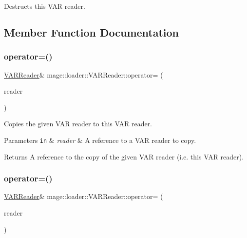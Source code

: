 Destructs this V\+AR reader. 

\subsection{Member Function Documentation}
\hypertarget{classmage_1_1loader_1_1_v_a_r_reader_a78d39071ad5103c848782ff82be397bb}{}\label{classmage_1_1loader_1_1_v_a_r_reader_a78d39071ad5103c848782ff82be397bb} 
\subsubsection{\texorpdfstring{operator=()}{operator=()}\hspace{0.1cm}{\footnotesize\ttfamily [1/2]}}
{\footnotesize\ttfamily \hyperlink{classmage_1_1loader_1_1_v_a_r_reader}{V\+A\+R\+Reader}\& mage\+::loader\+::\+V\+A\+R\+Reader\+::operator= (\begin{DoxyParamCaption}\item[{const \hyperlink{classmage_1_1loader_1_1_v_a_r_reader}{V\+A\+R\+Reader} \&}]{reader }\end{DoxyParamCaption})\hspace{0.3cm}{\ttfamily [delete]}}

Copies the given V\+AR reader to this V\+AR reader.


\begin{DoxyParams}[1]{Parameters}
\mbox{\tt in}  & {\em reader} & A reference to a V\+AR reader to copy. \\
\hline
\end{DoxyParams}
\begin{DoxyReturn}{Returns}
A reference to the copy of the given V\+AR reader (i.\+e. this V\+AR reader). 
\end{DoxyReturn}
\hypertarget{classmage_1_1loader_1_1_v_a_r_reader_a0da01229f594cb701b3e20d53be9d16e}{}\label{classmage_1_1loader_1_1_v_a_r_reader_a0da01229f594cb701b3e20d53be9d16e} 
\subsubsection{\texorpdfstring{operator=()}{operator=()}\hspace{0.1cm}{\footnotesize\ttfamily [2/2]}}
{\footnotesize\ttfamily \hyperlink{classmage_1_1loader_1_1_v_a_r_reader}{V\+A\+R\+Reader}\& mage\+::loader\+::\+V\+A\+R\+Reader\+::operator= (\begin{DoxyParamCaption}\item[{\hyperlink{classmage_1_1loader_1_1_v_a_r_reader}{V\+A\+R\+Reader} \&\&}]{reader }\end{DoxyParamCaption})\hspace{0.3cm}{\ttfamily [delete]}}


